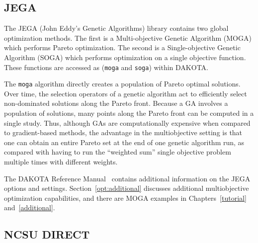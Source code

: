 \subsection{JEGA}\label{opt:software:jega}

The JEGA (John Eddy's Genetic Algorithms) library contains two global
optimization methods. The first is a Multi-objective Genetic Algorithm
(MOGA) which performs Pareto optimization. The second is a
Single-objective Genetic Algorithm (SOGA) which performs optimization
on a single objective function.  These functions are accessed as
(\texttt{moga} and \texttt{soga}) within DAKOTA.

The \texttt{moga} algorithm directly creates a population of Pareto
optimal solutions.  Over time, the selection operators of a genetic
algorithm act to efficiently select non-dominated solutions along the
Pareto front.  Because a GA involves a population of solutions, many
points along the Pareto front can be computed in a single study. Thus,
although GAs are computationally expensive when compared to
gradient-based methods, the advantage in the multiobjective setting is
that one can obtain an entire Pareto set at the end of one genetic
algorithm run, as compared with having to run the ``weighted sum''
single objective problem multiple times with different weights.

The DAKOTA Reference Manual~\cite{RefMan} contains additional
information on the JEGA options and settings.
Section~\ref{opt:additional} discusses additional multiobjective
optimization capabilities, and there are MOGA examples in
Chapters~\ref{tutorial} and~\ref{additional}.



\subsection{NCSU DIRECT}\label{opt:software:ncsu}

